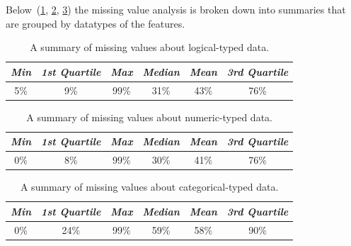 Below~(\ref{tab:missings-over-logical}, \ref{tab:missings-over-numeric}, \ref{tab:missings-over-categorical}) the missing value analysis is broken down into summaries that are grouped by datatypes of the features.

 \begin{table}[h!]
  \begin{center}
    \caption{A summary of missing values about logical-typed data.}
    \label{tab:missings-over-logical}
    \begin{tabular}{|c|c|c|c|c|c|}\hline
    \textit{Min} & \textit{1st Quartile}& \textit{Max} & \textit{Median} & \textit{Mean} & \textit{3rd Quartile} \\
      \hline
     5\% & 9\% & 99\% & 31\% & 43\% & 76\% \\ 
     \hline 
    \end{tabular}
  \end{center}
\end{table}
 
 \begin{table}[h!]
  \begin{center}
    \caption{A summary of missing values about numeric-typed data.}
    \label{tab:missings-over-numeric}
    \begin{tabular}{|c|c|c|c|c|c|}\hline
     \textit{Min} & \textit{1st Quartile}& \textit{Max} & \textit{Median} & \textit{Mean} & \textit{3rd Quartile} \\
      \hline
     0\% & 8\% & 99\% & 30\% & 41\% & 76\% \\ 
     \hline 
    \end{tabular}
  \end{center}
\end{table}
   

 \begin{table}[h!]
  \begin{center}
    \caption{A summary of missing values about categorical-typed data.}
    \label{tab:missings-over-categorical}
    \begin{tabular}{|c|c|c|c|c|c|}\hline
      \textit{Min} & \textit{1st Quartile}& \textit{Max} & \textit{Median} & \textit{Mean} & \textit{3rd Quartile} \\
      \hline
     0\% & 24\% & 99\% & 59\% & 58\% & 90\% \\ 
     \hline 
    \end{tabular}
  \end{center}
\end{table}

